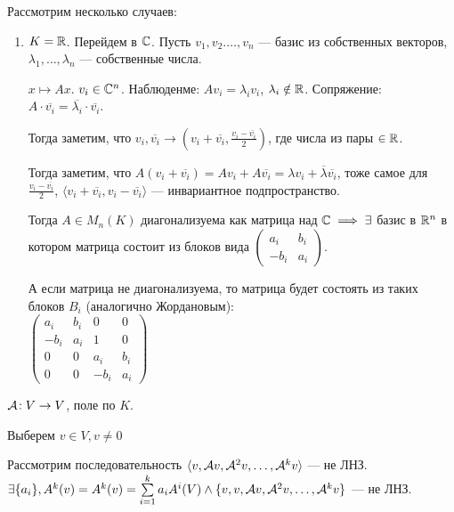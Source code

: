 Рассмотрим несколько случаев:
\begin{enumerate}
    \item $K = \mathbb{R}$. Перейдем в  $\mathbb{C}$. Пусть  $v_1, v_2. \ldots, v_n$ --- базис из собственных векторов, $\lambda_1, \ldots, \lambda_n$ --- собственные числа.

        $x \mapsto Ax$.  $v_i \in \mathbb{C}^n$.  Наблюденме: $Av_i = \lambda_i v_i$,  $\lambda_i \notin \mathbb{R}$. Сопряжение:  $A \cdot \overline{v_i} = \overline{\lambda_i} \cdot \overline{v_i}$. 

        Тогда заметим, что $v_i, \overline{v_i} \to \left(v_i + \overline{v_i}, \frac{v_i - \overline{v_i}}{2}\right)$, где числа из пары $\in \mathbb{R}$. 

        Тогда заметим, что $A(v_i + \overline{v_i}) = Av_i + A\overline{v_i} = \lambda v_i + \overline{\lambda} \overline{v_i}$, тоже самое для  $\frac{v_i - \overline{v_i}}{2}$, $\langle v_i + \overline{v_i}, v_i - \overline{v_i} \rangle $ --- инвариантное подпространство.  

        Тогда $A \in M_n(K)$ диагонализуема как матрица над $\mathbb{C} \implies \exists$ базис в  $\mathbb{R}^n$ в котором матрица состоит из блоков вида $\begin{pmatrix} a_i & b_i \\ -b_i & a_i\end{pmatrix}$. 

        А если матрица не диагонализуема, то матрица будет состоять из таких блоков $B_i$ (аналогично Жордановым):\\ $\begin{pmatrix} a_i & b_i & 0 & 0 \\ -b_i & a_i & 1 & 0 \\ 0 & 0 & a_{i} & b_{i} \\ 0 & 0 & -b_{i} & a_{i} \end{pmatrix}$
\end{enumerate}
$\mathcal{A}\!: V \to V$, поле по  $K$.

Выберем  $v \in V, v \neq 0$

Рассмотрим последовательность  $\langle v, \mathcal{A} v, \mathcal{A}^2 v,\ldots, \mathcal{A}^k v \rangle$ --- не ЛНЗ.
$\exists \{a_i\}, A^k(v) = A^k(v) = \sum\limits_{i=1}^k a_i A^i(V) \land \{v, v, \mathcal{A} v, \mathcal{A}^2 v,\ldots, \mathcal{A}^k v\}$ --- не ЛНЗ.

